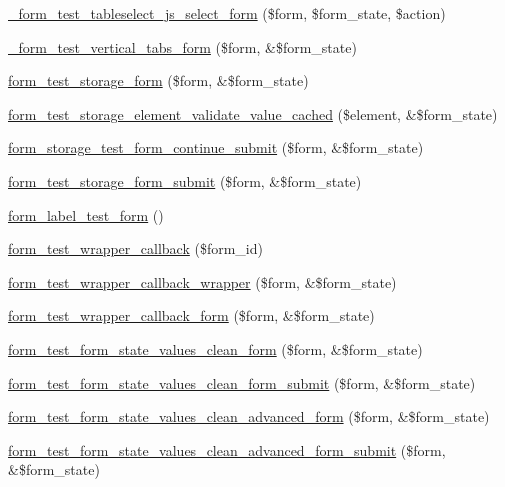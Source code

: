 \begin{DoxyCompactItemize}
\item 
\hyperlink{form__test_8module_a6054e25ea471f1c75ad64e0fc717be75}{\_\-form\_\-test\_\-tableselect\_\-js\_\-select\_\-form} (\$form, \$form\_\-state, \$action)
\item 
\hyperlink{form__test_8module_a068c7cb8e05eed176116a6fe654eb935}{\_\-form\_\-test\_\-vertical\_\-tabs\_\-form} (\$form, \&\$form\_\-state)
\item 
\hyperlink{form__test_8module_a842b92f357259c64dc7b2d2906aeb1f3}{form\_\-test\_\-storage\_\-form} (\$form, \&\$form\_\-state)
\item 
\hyperlink{form__test_8module_a5956b087bafac6839b4cee726df6195c}{form\_\-test\_\-storage\_\-element\_\-validate\_\-value\_\-cached} (\$element, \&\$form\_\-state)
\item 
\hyperlink{form__test_8module_a14e1121d5bdf2a79e3547f4d30d410b7}{form\_\-storage\_\-test\_\-form\_\-continue\_\-submit} (\$form, \&\$form\_\-state)
\item 
\hyperlink{form__test_8module_a52bef39edaea21de604463cd3cb60391}{form\_\-test\_\-storage\_\-form\_\-submit} (\$form, \&\$form\_\-state)
\item 
\hyperlink{form__test_8module_abe4abc920fb6b73d248328d7b4a0bb4d}{form\_\-label\_\-test\_\-form} ()
\item 
\hyperlink{form__test_8module_a9a193294926cee53f06ae8ab91371593}{form\_\-test\_\-wrapper\_\-callback} (\$form\_\-id)
\item 
\hyperlink{form__test_8module_a5f620025f655631e2d335ac02da61c27}{form\_\-test\_\-wrapper\_\-callback\_\-wrapper} (\$form, \&\$form\_\-state)
\item 
\hyperlink{form__test_8module_ac8506013dd0135407072df7d9bccbc97}{form\_\-test\_\-wrapper\_\-callback\_\-form} (\$form, \&\$form\_\-state)
\item 
\hyperlink{form__test_8module_ae4876c1eeb47a238a8069cb7f4e5e3f2}{form\_\-test\_\-form\_\-state\_\-values\_\-clean\_\-form} (\$form, \&\$form\_\-state)
\item 
\hyperlink{form__test_8module_acb2effd72a8a3d77d6491d2cde76b273}{form\_\-test\_\-form\_\-state\_\-values\_\-clean\_\-form\_\-submit} (\$form, \&\$form\_\-state)
\item 
\hyperlink{form__test_8module_a1f07ce9c1e970f02390ef3af042dcd3c}{form\_\-test\_\-form\_\-state\_\-values\_\-clean\_\-advanced\_\-form} (\$form, \&\$form\_\-state)
\item 
\hyperlink{form__test_8module_a4eb7997d96360631e23ef8956dd00f15}{form\_\-test\_\-form\_\-state\_\-values\_\-clean\_\-advanced\_\-form\_\-submit} (\$form, \&\$form\_\-state)

\end{DoxyCompactItemize}
